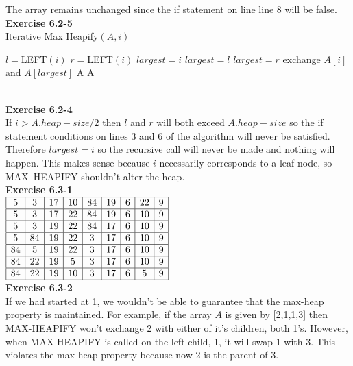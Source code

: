 \documentclass{article}
\begin{document}
The array remains unchanged since the if statement on line line 8 will be false.\\

\noindent\textbf{Exercise 6.2-5}\\
Iterative Max Heapify$(A,i)$
\begin{algorithm}
\begin{algorithmic}
\State $l =$LEFT$(i)$
\State $r =$LEFT$(i)$
\State $largest = i$
\State $largest =l$
\EndIf
{}
\State $largest =r$
\EndIf
{}
\State exchange $A[i]$ and $A[largest]$
\Else \Return A
\EndIf
\EndWhile
\State \Return A
\end{algorithmic}
\end{algorithm}\\

\noindent\textbf{Exercise 6.2-4}\\

If $i > A.heap-size/2$ then $l$ and $r$ will both exceed $A.heap-size$ so the if statement conditions on lines 3 and 6 of the algorithm will never be satisfied.  Therefore $largest = i$ so the recursive call will never be made and nothing will happen. This makes sense because $i$ necessarily corresponds to a leaf node, so MAX--HEAPIFY shouldn't alter the heap. \\

\noindent\textbf{Exercise 6.3-1}\\

$
\begin{array}{|c|c|c|c|c|c|c|c|c|}
\hline
5&3&17&10&84&19&6&22&9\\
\hline
5&3&17&22&84&19&6&10&9\\
\hline
5&3&19&22&84&17&6&10&9\\
\hline
5&84&19&22&3&17&6&10&9\\
\hline
84&5&19&22&3&17&6&10&9\\
\hline
84&22&19&5&3&17&6&10&9\\
\hline
84&22&19&10&3&17&6&5&9\\
\hline
\end{array}
$\\

\noindent\textbf{Exercise 6.3-2}\\

If we had started at 1, we wouldn't be able to guarantee that the max-heap property is maintained.  For example, if the array $A$ is given by [2,1,1,3] then MAX-HEAPIFY won't exchange 2 with either of it's children, both 1's.  However, when MAX-HEAPIFY is called on the left child, 1, it will swap 1 with 3.  This violates the max-heap property because now 2 is the parent of 3. \\
\end{document}
